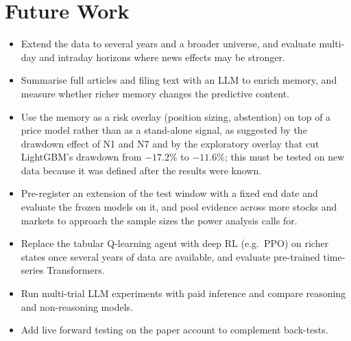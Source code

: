 \section{Future Work}
\begin{itemize}
  \item Extend the data to several years and a broader universe, and evaluate multi-day and intraday horizons where news effects may be stronger.
  \item Summarise full articles and filing text with an LLM to enrich memory, and measure whether richer memory changes the predictive content.
  \item Use the memory as a risk overlay (position sizing, abstention) on top of a price model rather than as a stand-alone signal, as suggested by the drawdown effect of N1 and N7 and by the exploratory overlay that cut LightGBM's drawdown from $-17.2\%$ to $-11.6\%$; this must be tested on new data because it was defined after the results were known.
  \item Pre-register an extension of the test window with a fixed end date and evaluate the frozen models on it, and pool evidence across more stocks and markets to approach the sample sizes the power analysis calls for.
  \item Replace the tabular Q-learning agent with deep RL (e.g.\ PPO) on richer states once several years of data are available, and evaluate pre-trained time-series Transformers.
  \item Run multi-trial LLM experiments with paid inference and compare reasoning and non-reasoning models.
  \item Add live forward testing on the paper account to complement back-tests.
\end{itemize}
